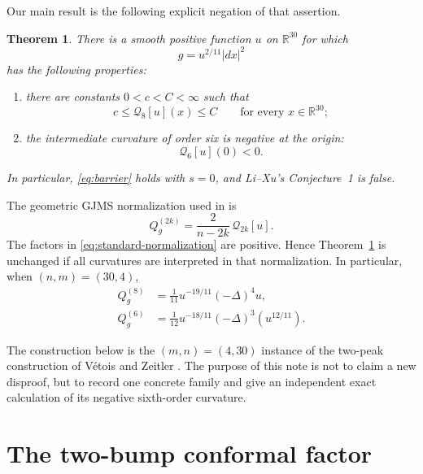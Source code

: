 \documentclass[11pt,reqno]{amsart}
\newtheorem{theorem}{Theorem}[section]
\theoremstyle{remark}
\newcommand{\R}{\mathbb{R}}
\newcommand{\Qlx}{\mathcal{Q}}
\begin{document}
Our main result is the following explicit negation of that assertion.

\begin{theorem}\label{thm:main}
There is a smooth positive function \(u\) on \(\R^{30}\) for which
\[
 g=u^{2/11}|dx|^2
\]
has the following properties:
\begin{enumerate}
\item there are constants \(0<c<C<\infty\) such that
\begin{equation}\label{eq:top-bounded}
 c\leq \Qlx_8[u](x)\leq C
 \qquad\text{for every }x\in\R^{30};
\end{equation}
\item the intermediate curvature of order six is negative at the origin:
\begin{equation}\label{eq:q6-negative}
 \Qlx_6[u](0)<0.
\end{equation}
\end{enumerate}
In particular, \eqref{eq:barrier} holds with \(s=0\), and Li--Xu's
Conjecture~1 is false.
\end{theorem}

The geometric GJMS normalization used in
\cite[(1.1)]{VetoisZeitler} is
\begin{equation}\label{eq:standard-normalization}
 Q_g^{(2k)}=\frac{2}{n-2k}\,\Qlx_{2k}[u].
\end{equation}
The factors in \eqref{eq:standard-normalization} are positive.  Hence
Theorem~\ref{thm:main} is unchanged if all curvatures are interpreted in
that normalization.  In particular, when \((n,m)=(30,4)\),
\begin{align}
 Q_g^{(8)}
 &=\frac1{11}u^{-19/11}(-\Delta)^4u,
 \label{eq:q8-standard}\\
 Q_g^{(6)}
 &=\frac1{12}u^{-18/11}(-\Delta)^3(u^{12/11}).
 \label{eq:q6-standard}
\end{align}

The construction below is the \((m,n)=(4,30)\) instance of the
two-peak construction of V\'etois and Zeitler
\cite[Theorem~1.2 and \S4]{VetoisZeitler}.  The purpose of this note is
not to claim a new disproof, but to record one concrete family and give
an independent exact calculation of its negative sixth-order curvature.

\section{The two-bump conformal factor}
\end{document}
